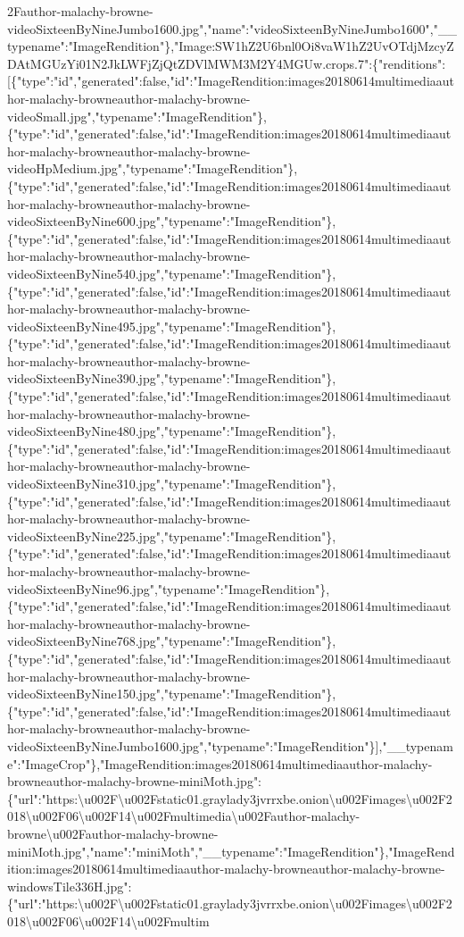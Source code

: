 2Fauthor-malachy-browne-videoSixteenByNineJumbo1600.jpg","name":"videoSixteenByNineJumbo1600","\_\_typename":"ImageRendition"\},"Image:SW1hZ2U6bnl0Oi8vaW1hZ2UvOTdjMzcyZDAtMGUzYi01N2JkLWFjZjQtZDVlMWM3M2Y4MGUw.crops.7":\{"renditions":{[}\{"type":"id","generated":false,"id":"ImageRendition:images20180614multimediaauthor-malachy-browneauthor-malachy-browne-videoSmall.jpg","typename":"ImageRendition"\},\{"type":"id","generated":false,"id":"ImageRendition:images20180614multimediaauthor-malachy-browneauthor-malachy-browne-videoHpMedium.jpg","typename":"ImageRendition"\},\{"type":"id","generated":false,"id":"ImageRendition:images20180614multimediaauthor-malachy-browneauthor-malachy-browne-videoSixteenByNine600.jpg","typename":"ImageRendition"\},\{"type":"id","generated":false,"id":"ImageRendition:images20180614multimediaauthor-malachy-browneauthor-malachy-browne-videoSixteenByNine540.jpg","typename":"ImageRendition"\},\{"type":"id","generated":false,"id":"ImageRendition:images20180614multimediaauthor-malachy-browneauthor-malachy-browne-videoSixteenByNine495.jpg","typename":"ImageRendition"\},\{"type":"id","generated":false,"id":"ImageRendition:images20180614multimediaauthor-malachy-browneauthor-malachy-browne-videoSixteenByNine390.jpg","typename":"ImageRendition"\},\{"type":"id","generated":false,"id":"ImageRendition:images20180614multimediaauthor-malachy-browneauthor-malachy-browne-videoSixteenByNine480.jpg","typename":"ImageRendition"\},\{"type":"id","generated":false,"id":"ImageRendition:images20180614multimediaauthor-malachy-browneauthor-malachy-browne-videoSixteenByNine310.jpg","typename":"ImageRendition"\},\{"type":"id","generated":false,"id":"ImageRendition:images20180614multimediaauthor-malachy-browneauthor-malachy-browne-videoSixteenByNine225.jpg","typename":"ImageRendition"\},\{"type":"id","generated":false,"id":"ImageRendition:images20180614multimediaauthor-malachy-browneauthor-malachy-browne-videoSixteenByNine96.jpg","typename":"ImageRendition"\},\{"type":"id","generated":false,"id":"ImageRendition:images20180614multimediaauthor-malachy-browneauthor-malachy-browne-videoSixteenByNine768.jpg","typename":"ImageRendition"\},\{"type":"id","generated":false,"id":"ImageRendition:images20180614multimediaauthor-malachy-browneauthor-malachy-browne-videoSixteenByNine150.jpg","typename":"ImageRendition"\},\{"type":"id","generated":false,"id":"ImageRendition:images20180614multimediaauthor-malachy-browneauthor-malachy-browne-videoSixteenByNineJumbo1600.jpg","typename":"ImageRendition"\}{]},"\_\_typename":"ImageCrop"\},"ImageRendition:images20180614multimediaauthor-malachy-browneauthor-malachy-browne-miniMoth.jpg":\{"url":"https:\textbackslash{}u002F\textbackslash{}u002Fstatic01.graylady3jvrrxbe.onion\textbackslash{}u002Fimages\textbackslash{}u002F2018\textbackslash{}u002F06\textbackslash{}u002F14\textbackslash{}u002Fmultimedia\textbackslash{}u002Fauthor-malachy-browne\textbackslash{}u002Fauthor-malachy-browne-miniMoth.jpg","name":"miniMoth","\_\_typename":"ImageRendition"\},"ImageRendition:images20180614multimediaauthor-malachy-browneauthor-malachy-browne-windowsTile336H.jpg":\{"url":"https:\textbackslash{}u002F\textbackslash{}u002Fstatic01.graylady3jvrrxbe.onion\textbackslash{}u002Fimages\textbackslash{}u002F2018\textbackslash{}u002F06\textbackslash{}u002F14\textbackslash{}u002Fmultim